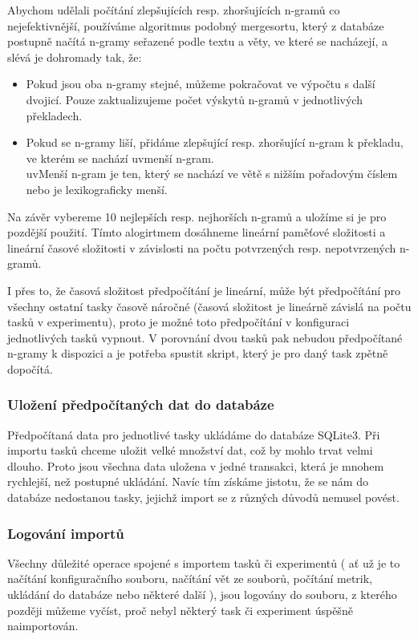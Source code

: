 Abychom udělali počítání zlepšujících resp. zhoršujících \mbox{n-gramů} co nejefektivnější,
  používáme algoritmus podobný mergesortu,
  který z databáze postupně načítá \mbox{n-gramy} seřazené podle textu a věty, ve které se nacházejí, 
  a slévá je dohromady tak, že:

\begin{itemize}
  \item Pokud jsou oba \mbox{n-gramy} stejné, můžeme pokračovat ve výpočtu s další dvojicí.
    Pouze zaktualizujeme počet výskytů \mbox{n-gramů} v jednotlivých překladech. 
  \item Pokud se \mbox{n-gramy} liší, přidáme zlepšující resp. zhoršující \mbox{n-gram} k překladu,
    ve kterém se nachází uv{menší \mbox{n-gram}}. \\
    uv{Menší \mbox{n-gram}} je ten, který se nachází ve větě s nižším pořadovým číslem
    nebo je lexikograficky menší.
\end{itemize}

Na závěr vybereme 10 nejlepších resp. nejhorších \mbox{n-gramů}
  a uložíme si je pro pozdější použití.
Tímto alogirtmem dosáhneme lineární paměťové složitosti a
  lineární časové složitosti v závislosti na počtu potvrzených resp. nepotvrzených \mbox{n-gramů}.

I přes to, že časová složitost předpočítání je lineární,
  může být předpočítání pro všechny ostatní tasky časově náročné
  (časová složitost je lineárně závislá na počtu tasků v experimentu),
  proto je možné toto předpočítání v konfiguraci jednotlivých tasků vypnout.
V porovnání dvou tasků pak nebudou předpočítané \mbox{n-gramy} k dispozici
  a je potřeba spustit skript,
  který je pro daný task zpětně dopočítá.

\subsubsection{Uložení předpočítaných dat do databáze}
Předpočítaná data pro jednotlivé tasky ukládáme do databáze SQLite3.
Při importu tasků chceme uložit velké množství dat,
  což by mohlo trvat velmi dlouho.
Proto jsou všechna data uložena v jedné transakci,
  která je mnohem rychlejší,
  než postupné ukládání.
Navíc tím získáme jistotu,
  že se nám do databáze nedostanou tasky,
  jejichž import se z různých důvodů nemusel povést.
 
\subsubsection{Logování importů}
Všechny důležité operace spojené s importem tasků či experimentů
  ( ať už je to načítání konfiguračního souboru, načítání vět ze souborů,
  počítání metrik, ukládání do databáze nebo některé další ), 
  jsou logovány do souboru,
  z kterého později můžeme vyčíst,
  proč nebyl některý task či experiment úspěšně naimportován. 


